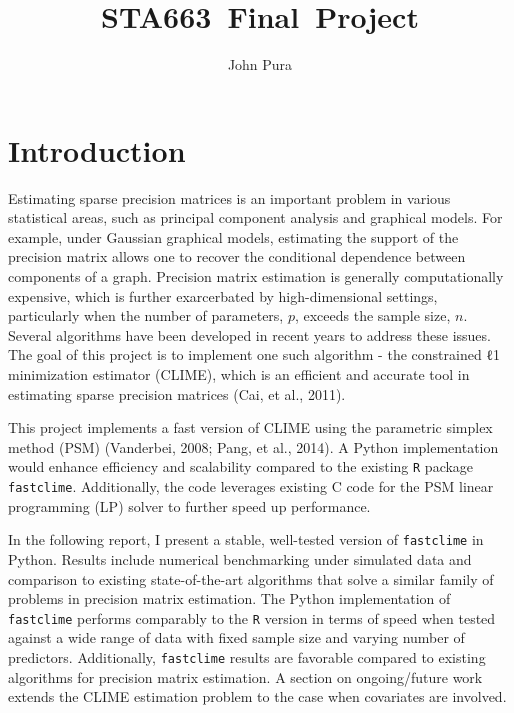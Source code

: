 \documentclass{article}
\title{STA663\ Final\ Project}
\author{John Pura}
\begin{document}
    
    
    \maketitle
    
    

    
    \section{Introduction}\label{introduction}

    Estimating sparse precision matrices is an important problem in various
statistical areas, such as principal component analysis and graphical
models. For example, under Gaussian graphical models, estimating the
support of the precision matrix allows one to recover the conditional
dependence between components of a graph. Precision matrix estimation is
generally computationally expensive, which is further exarcerbated by
high-dimensional settings, particularly when the number of parameters,
$p$, exceeds the sample size, $n$. Several algorithms have been
developed in recent years to address these issues. The goal of this
project is to implement one such algorithm - the constrained ℓ1
minimization estimator (CLIME), which is an efficient and accurate tool
in estimating sparse precision matrices (Cai, et al., 2011).

This project implements a fast version of CLIME using the parametric
simplex method (PSM) (Vanderbei, 2008; Pang, et al., 2014). A Python
implementation would enhance efficiency and scalability compared to the
existing \texttt{R} package \texttt{fastclime}. Additionally, the code
leverages existing C code for the PSM linear programming (LP) solver to
further speed up performance.

In the following report, I present a stable, well-tested version of
\texttt{fastclime} in Python. Results include numerical benchmarking
under simulated data and comparison to existing state-of-the-art
algorithms that solve a similar family of problems in precision matrix
estimation. The Python implementation of \texttt{fastclime} performs
comparably to the \texttt{R} version in terms of speed when tested
against a wide range of data with fixed sample size and varying number
of predictors. Additionally, \texttt{fastclime} results are favorable
compared to existing algorithms for precision matrix estimation. A
section on ongoing/future work extends the CLIME estimation problem to
the case when covariates are involved.
\end{document}

